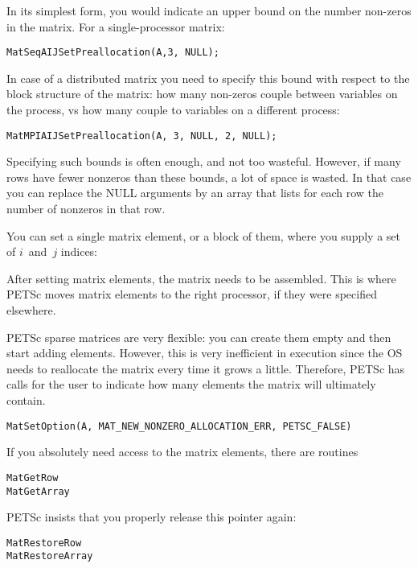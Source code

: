 In its simplest form, you would indicate an upper bound on the number
non-zeros in the matrix. For a single-processor matrix:

\begin{verbatim}
MatSeqAIJSetPreallocation(A,3, NULL);
\end{verbatim}

In case of a distributed matrix you need to specify this bound with
respect to the block structure of the matrix: how many non-zeros
couple between variables on the process, vs how many couple to
variables on a different process:

\begin{verbatim}
MatMPIAIJSetPreallocation(A, 3, NULL, 2, NULL);
\end{verbatim}

Specifying such bounds is often enough, and not too wasteful. However,
if many rows have fewer nonzeros than these bounds, a lot of space is
wasted. In that case you can replace the NULL arguments by an array
that lists for each row the number of nonzeros in that row.

You can set a single matrix element, or a block of them, where you
supply a set of $i$~and~$j$ indices:
%

After setting matrix elements, the matrix needs to be assembled. This
is where PETSc moves matrix elements to the right processor, if they
were specified elsewhere.
%

PETSc sparse matrices are very flexible: you can create them empty and
then start adding elements. However, this is very inefficient in
execution since the \ac{OS} needs to reallocate the matrix every time
it grows a little. Therefore, PETSc has calls for the user to indicate
how many elements the matrix will ultimately contain.
%

\begin{verbatim}
MatSetOption(A, MAT_NEW_NONZERO_ALLOCATION_ERR, PETSC_FALSE)
\end{verbatim}

If you absolutely need access to the matrix elements, there are routines

\begin{lstlisting}
MatGetRow
MatGetArray
\end{lstlisting}

PETSc insists that you properly release this pointer again:

\begin{lstlisting}
MatRestoreRow
MatRestoreArray
\end{lstlisting}

